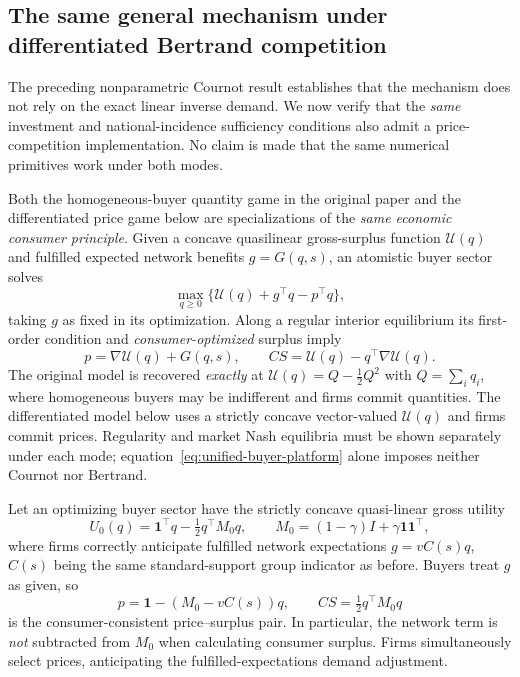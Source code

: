 \subsection{The same general mechanism under differentiated Bertrand competition}
\label{subsec:bertrand-R16}
The preceding nonparametric Cournot result establishes that
the mechanism does not rely on the exact linear inverse demand.
We now verify that the \emph{same} investment and national-incidence
sufficiency conditions also admit a price-competition implementation.
No claim is made that the same numerical primitives work under
both modes.

Both the homogeneous-buyer quantity game in the
original paper and the differentiated price game below are
specializations of the \emph{same economic consumer principle}.
Given a concave quasilinear gross-surplus function
\(\mathcal U(q)\) and fulfilled expected network benefits
\(g=G(q,s)\), an atomistic buyer sector solves
\[
  \max_{q\ge0}\{
     \mathcal U(q)+g^\top q-p^\top q\},
\]
taking \(g\) as fixed in its optimization.  Along a regular
interior equilibrium its first-order condition and
\emph{consumer-optimized} surplus imply
\begin{equation}
 p=\nabla\mathcal U(q)+G(q,s),\qquad
 CS=\mathcal U(q)-q^\top\nabla\mathcal U(q).
 \label{eq:unified-buyer-platform}
\end{equation}
The original model is recovered \emph{exactly}
at \(\mathcal U(q)=Q-\frac12Q^2\) with \(Q=\sum_iq_i\),
where homogeneous buyers may be indifferent and
firms commit quantities.  The differentiated model below
uses a strictly concave vector-valued \(\mathcal U(q)\)
and firms commit prices.  Regularity and market Nash
equilibria must be shown separately under each mode;
equation~\eqref{eq:unified-buyer-platform} alone
imposes neither Cournot nor Bertrand.

Let an optimizing buyer sector have the strictly concave
quasi-linear gross utility
\[
 U_0(q)=\boldsymbol{1}^{\top}q-\tfrac12q^\top M_0q,\qquad
 M_0=(1-\gamma)I+\gamma\boldsymbol{1}\boldsymbol{1}^{\top},
\]
where firms correctly anticipate fulfilled network expectations
\(g=vC(s)q\), \(C(s)\) being the same standard-support group
indicator as before. Buyers treat \(g\) as given, so
\begin{equation}
 p=\boldsymbol{1}-(M_0-vC(s))q,\qquad
 CS=\tfrac12q^\top M_0q
 \label{eq:bertrand-consumer-consistent}
\end{equation}
is the consumer-consistent price--surplus pair. In particular,
the network term is \emph{not} subtracted from \(M_0\) when
calculating consumer surplus. Firms simultaneously select prices,
anticipating the fulfilled-expectations demand adjustment.

